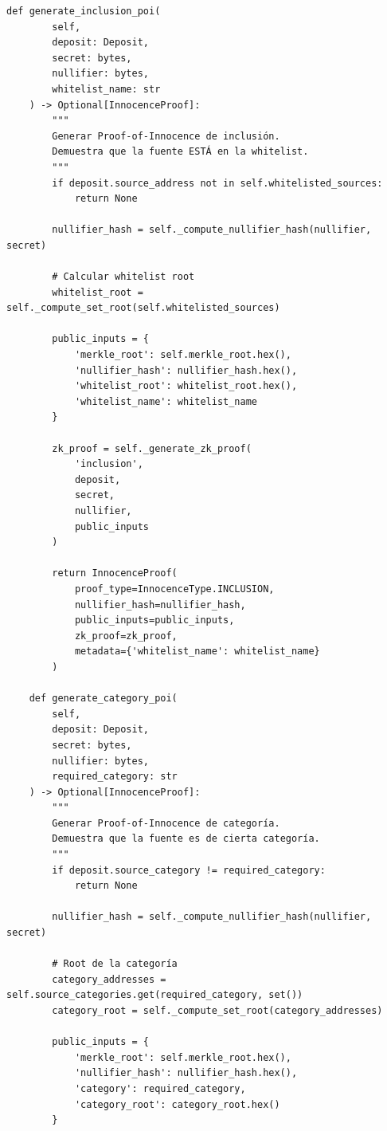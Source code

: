 \documentclass[11pt,a4paper,twoside]{book}
\theoremstyle{definition}
\theoremstyle{remark}
\begin{document}
\begin{lstlisting}[language=circom, caption={Circuito de Proof-of-Innocence temporal}]
    def generate_inclusion_poi(
        self,
        deposit: Deposit,
        secret: bytes,
        nullifier: bytes,
        whitelist_name: str
    ) -> Optional[InnocenceProof]:
        """
        Generar Proof-of-Innocence de inclusión.
        Demuestra que la fuente ESTÁ en la whitelist.
        """
        if deposit.source_address not in self.whitelisted_sources:
            return None
        
        nullifier_hash = self._compute_nullifier_hash(nullifier, secret)
        
        # Calcular whitelist root
        whitelist_root = self._compute_set_root(self.whitelisted_sources)
        
        public_inputs = {
            'merkle_root': self.merkle_root.hex(),
            'nullifier_hash': nullifier_hash.hex(),
            'whitelist_root': whitelist_root.hex(),
            'whitelist_name': whitelist_name
        }
        
        zk_proof = self._generate_zk_proof(
            'inclusion',
            deposit,
            secret,
            nullifier,
            public_inputs
        )
        
        return InnocenceProof(
            proof_type=InnocenceType.INCLUSION,
            nullifier_hash=nullifier_hash,
            public_inputs=public_inputs,
            zk_proof=zk_proof,
            metadata={'whitelist_name': whitelist_name}
        )
    
    def generate_category_poi(
        self,
        deposit: Deposit,
        secret: bytes,
        nullifier: bytes,
        required_category: str
    ) -> Optional[InnocenceProof]:
        """
        Generar Proof-of-Innocence de categoría.
        Demuestra que la fuente es de cierta categoría.
        """
        if deposit.source_category != required_category:
            return None
        
        nullifier_hash = self._compute_nullifier_hash(nullifier, secret)
        
        # Root de la categoría
        category_addresses = self.source_categories.get(required_category, set())
        category_root = self._compute_set_root(category_addresses)
        
        public_inputs = {
            'merkle_root': self.merkle_root.hex(),
            'nullifier_hash': nullifier_hash.hex(),
            'category': required_category,
            'category_root': category_root.hex()
        }
        

\end{lstlisting}
\end{document}
